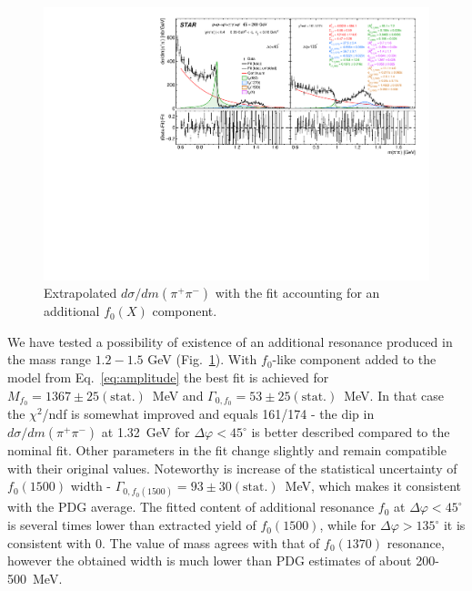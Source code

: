 \begin{figure}%
\centering
\includegraphics[width=\textwidth,page=1]{graphics/physicsResults/InvMassFit/EXTRA_RESONANCE/Ratio_PiPiInvMass_Fit.pdf}
%
\caption{Extrapolated $d\sigma/dm(\pi^{+}\pi^{-})$ with the fit accounting for an additional $f_{0}(X)$ component.}
\label{invMassFit_EXTRA_RESONANCE}
\end{figure}



%
We have tested a possibility of existence of an additional resonance produced in the mass range $1.2-1.5$ GeV  (Fig.~\ref{invMassFit_EXTRA_RESONANCE}). With $f_0$-like component added to the model from Eq.~\eqref{eq:amplitude} the best fit is achieved for $M_{f_0}=1367 \pm 25 (\text{stat.})$~MeV and $\Gamma_{0,f_0} = 53 \pm 25 (\text{stat.})$~MeV. In that case the $\chi^{2}$/ndf is somewhat improved and equals 161/174 - the dip in $d\sigma/dm(\pi^{+}\pi^{-})$ at 1.32~GeV for $\Delta\varphi<45^{\circ}$ is better described compared to the nominal fit. Other parameters in the fit change slightly and remain compatible with their original values. Noteworthy is increase of the statistical uncertainty of $f_{0}(1500)$ width - $\Gamma_{0,f_0(1500)} = 93 \pm 30 (\text{stat.})$~MeV, which makes it consistent with the PDG average. The fitted content of additional resonance $f_0$ at $\Delta\varphi<45^{\circ}$ is several times lower than extracted yield of $f_{0}(1500)$, while for $\Delta\varphi>135^{\circ}$ it is consistent with 0. The value of mass agrees with that of $f_{0}(1370)$ resonance, however the obtained width is much lower than PDG estimates of about 200-500~MeV.
%

